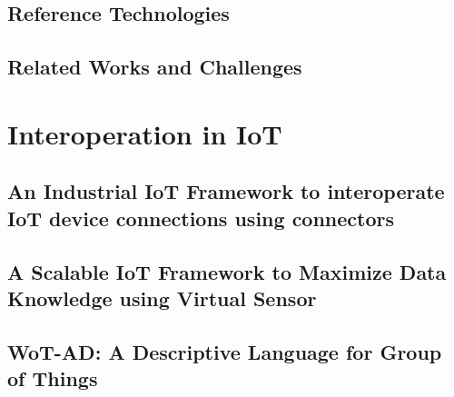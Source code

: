\documentclass[a4paper,10pt,twoside]{ThesisStyle}
\begin{document}
\chapter{Reference Technologies}
\label{ch:reference_technologies}
 

\chapter{Related Works and Challenges}
\label{ch:performance_evaluation}




\part{Interoperation in IoT}
\label{pa:part2}

\chapter{An Industrial IoT Framework to interoperate IoT device connections using connectors} 
\label{ch:connector} 



\chapter{A Scalable IoT Framework to Maximize Data Knowledge using Virtual Sensor}

\label{ch:VSF} 


\chapter{WoT-AD: A Descriptive Language for Group of Things} 
\label{ch:Wot-AD}



\end{document}
